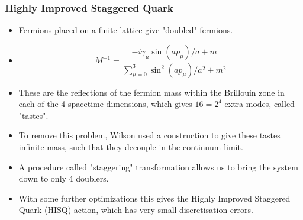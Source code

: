 \documentclass{beamer}
\begin{document}
\begin{frame}
    \frametitle{Highly Improved Staggered Quark}
    \begin{itemize}
        \item Fermions placed on a finite lattice give "doubled" fermions\cite{2016Chakraborty}.
        \item[]
            \begin{equation}
    M^{-1} = \frac{-i\gamma_\mu \sin(ap_\mu)/a+m}{\sum_{\mu=0}^3 \sin^2(ap_\mu)/a^2 + m^2}
    \end{equation}
    \item These are the reflections of the fermion mass within the Brillouin zone in each of the 4 spacetime dimensions, which gives $16=2^4$ extra modes, called "tastes".
    \item To remove this problem, Wilson\cite{1974Wilson} used a construction to give these tastes infinite mass, such that they decouple in the continuum limit. 
    \item A procedure called "staggering" transformation\cite{mason2006high} allows us to bring the system down to only 4 doublers.
    \item With some further optimizations this gives the Highly Improved Staggered Quark (HISQ) action, which has very small discretisation errors.
    \end{itemize}
    \end{frame}
\end{document}
